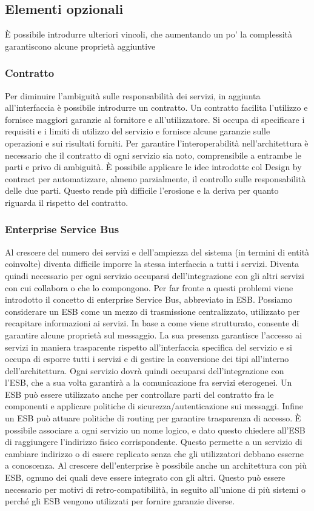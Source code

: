 \documentclass[a4paper,12pt]{report}
\begin{document}
\subsection{Elementi opzionali} 
È possibile introdurre ulteriori vincoli, che aumentando un po' la complessità garantiscono alcune proprietà aggiuntive 
\subsubsection{Contratto}
Per diminuire l'ambiguità sulle responsabilità dei servizi, in aggiunta all'interfaccia è possibile introdurre un contratto.
Un contratto facilita l'utilizzo e fornisce maggiori garanzie al fornitore e all'utilizzatore.
Si occupa di specificare i requisiti e i limiti di utilizzo del servizio e fornisce alcune garanzie sulle operazioni e sui risultati forniti.
Per garantire l'interoperabilità nell'architettura è necessario che il contratto di ogni servizio sia noto, comprensibile a entrambe le parti e privo di ambiguità.
È possibile applicare le idee introdotte col Design by contract \cite{meyer1992applying} per automatizzare, almeno parzialmente, il controllo sulle responsabilità delle due parti. 
Questo rende più difficile l'erosione e la deriva per quanto riguarda il rispetto del contratto. 
\subsubsection{Enterprise Service Bus}
Al crescere del numero dei servizi e dell'ampiezza del sistema (in termini di entità coinvolte) diventa difficile imporre la stessa interfaccia a tutti i servizi.
Diventa quindi necessario per ogni servizio occuparsi dell'integrazione con gli altri servizi con cui collabora o che lo compongono.
Per far fronte a questi problemi viene introdotto il concetto di enterprise Service Bus, abbreviato in ESB. 
Possiamo considerare un ESB come un mezzo di trasmissione centralizzato, utilizzato per recapitare informazioni ai servizi. 
In base a come viene strutturato, consente di garantire alcune proprietà sul messaggio.
La sua presenza garantisce l'accesso ai servizi in maniera trasparente rispetto all'interfaccia specifica del servizio e si occupa di esporre tutti i servizi e di gestire la conversione dei tipi all'interno dell'architettura. 
Ogni servizio dovrà quindi occuparsi dell'integrazione con l'ESB, che a sua volta garantirà a la comunicazione fra servizi eterogenei.
Un ESB può essere utilizzato anche per controllare parti del contratto fra le componenti e applicare politiche di sicurezza/autenticazione sui messaggi.
Infine un ESB può attuare politiche di routing per garantire trasparenza di accesso. 
È possibile associare a ogni servizio un nome logico, e dato questo chiedere all'ESB
di raggiungere l'indirizzo fisico corrispondente.
Questo permette a un servizio di cambiare indirizzo o di essere replicato senza che gli utilizzatori debbano esserne a conoscenza. 
Al crescere dell'enterprise è possibile anche un architettura con più ESB, ognuno dei quali deve essere integrato con gli altri. 
Questo può essere necessario per motivi di retro-compatibilità, in seguito all'unione di più sistemi o perché gli ESB vengono utilizzati per fornire garanzie diverse.
\end{document}
